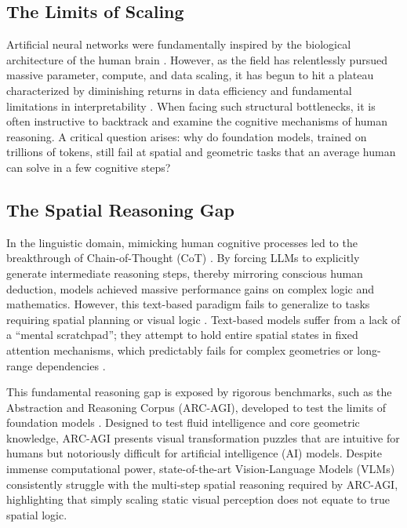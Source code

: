 \documentclass{l4proj}
\begin{document}
\subsection{The Limits of Scaling}
Artificial neural networks were fundamentally inspired by the biological architecture of the human brain \citep{mcculloch1943logical}. However, as the field has relentlessly pursued massive parameter, compute, and data scaling, it has begun to hit a plateau characterized by diminishing returns in data efficiency and fundamental limitations in interpretability \citep{hoffmann2022training, villalobos2022will, bender2021dangers}. When facing such structural bottlenecks, it is often instructive to backtrack and examine the cognitive mechanisms of human reasoning. A critical question arises: why do foundation models, trained on trillions of tokens, still fail at spatial and geometric tasks that an average human can solve in a few cognitive steps?

\subsection{The Spatial Reasoning Gap}
In the linguistic domain, mimicking human cognitive processes led to the breakthrough of Chain-of-Thought (CoT) \citep{wei2022chain}. By forcing LLMs to explicitly generate intermediate reasoning steps, thereby mirroring conscious human deduction, models achieved massive performance gains on complex logic and mathematics. However, this text-based paradigm fails to generalize to tasks requiring spatial planning or visual logic \citep{vsp2025, topobench2026}. Text-based models suffer from a lack of a ``mental scratchpad''; they attempt to hold entire spatial states in fixed attention mechanisms, which predictably fails for complex geometries or long-range dependencies \citep{zhang2024mindseye, latentsketchpad2025}.

This fundamental reasoning gap is exposed by rigorous benchmarks, such as the Abstraction and Reasoning Corpus (ARC-AGI), developed to test the limits of foundation models \citep{chollet2019arc}. Designed to test fluid intelligence and core geometric knowledge, ARC-AGI presents visual transformation puzzles that are intuitive for humans but notoriously difficult for artificial intelligence (AI) models. Despite immense computational power, state-of-the-art Vision-Language Models (VLMs) consistently struggle with the multi-step spatial reasoning required by ARC-AGI, highlighting that simply scaling static visual perception does not equate to true spatial logic.
\end{document}
